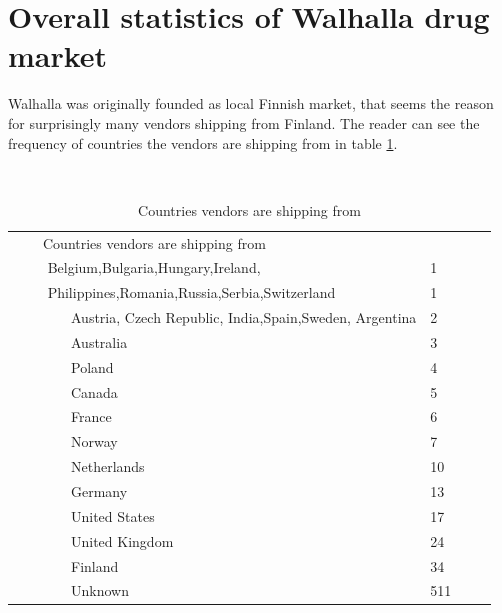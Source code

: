 \documentclass[
  digital, %
  table,   %
  lof,     %
  lot,     %
  oneside
]{fithesis3}
\begin{document}
\section{Overall statistics of Walhalla drug market}

Walhalla was originally founded as local Finnish market,
that seems the reason for surprisingly many vendors shipping from Finland.
The reader can see the frequency of countries the vendors are shipping from in table \ref{shipcount}.

\begin{table}
    \caption{Countries vendors are shipping from}
    \label{shipcount}
    \begin{tabular}{|l|l|}
    Countries vendors are shipping from\\
      Belgium,Bulgaria,Hungary,Ireland, & 1\\
      Philippines,Romania,Russia,Serbia,Switzerland& 1   \\
        Austria, Czech Republic, India,Spain,Sweden, Argentina  & 2   \\
        Australia                                    & 3   \\ 
        Poland                                       & 4   \\ 
        Canada                                       & 5   \\ 
        France                                       & 6   \\ 
        Norway                                       & 7   \\ 
        Netherlands                                  & 10  \\ 
        Germany                                      & 13  \\ 
        United States                                & 17  \\ 
        United Kingdom                               & 24  \\ 
        Finland                                      & 34  \\ 
        Unknown                                      & 511  
    \end{tabular}
\end{table}
\end{document}
